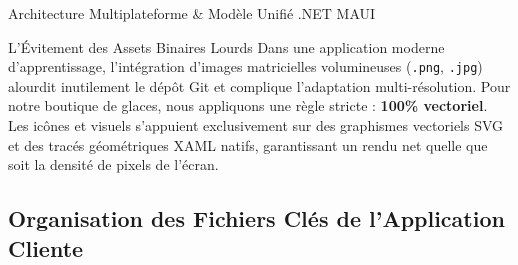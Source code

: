 \documentclass[a4paper,11pt]{report}
\begin{document}
\begin{schemabox}{Architecture Multiplateforme \& Modèle Unifié .NET MAUI}
\begin{center}
\end{center}
\end{schemabox}

\vspace{0.2cm}

\begin{bestpracticebox}{L'Évitement des Assets Binaires Lourds}
Dans une application moderne d'apprentissage, l'intégration d'images matricielles volumineuses (\texttt{.png}, \texttt{.jpg}) alourdit inutilement le dépôt Git et complique l'adaptation multi-résolution.
Pour notre boutique de glaces, nous appliquons une règle stricte : \textbf{100\% vectoriel}. Les icônes et visuels s'appuient exclusivement sur des graphismes vectoriels SVG et des tracés géométriques XAML natifs, garantissant un rendu net quelle que soit la densité de pixels de l'écran.
\end{bestpracticebox}

\newpage

\subsection*{Organisation des Fichiers Clés de l'Application Cliente}
\end{document}
